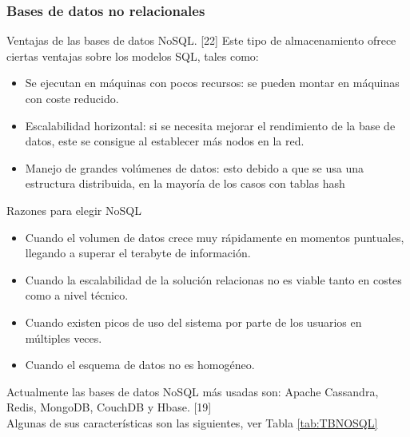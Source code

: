 \subsubsection{Bases de datos no relacionales}

Ventajas de las bases de datos NoSQL. [22]
Este tipo de almacenamiento ofrece ciertas ventajas sobre los modelos SQL, tales como:
\begin{itemize}
	\item Se ejecutan en máquinas con pocos recursos: se pueden montar en máquinas con coste 
	reducido.
	\item Escalabilidad horizontal: si se necesita mejorar el rendimiento de la base de datos, este 
	se consigue al establecer más nodos en la red.
	\item Manejo de grandes volúmenes de datos: esto debido a que se usa una estructura 
	distribuida, en la mayoría de los casos con tablas hash
\end{itemize}


Razones para elegir NoSQL
\begin{itemize}
	\item 	Cuando el volumen de datos crece muy rápidamente en momentos puntuales, llegando a superar el terabyte de información.
	\item 	Cuando la escalabilidad de la solución relacionas no es viable tanto en costes como a nivel técnico.
	\item 	Cuando existen picos de uso del sistema por parte de los usuarios en múltiples veces.
	\item 		Cuando el esquema de datos no es homogéneo. 
\end{itemize}

Actualmente las bases de datos NoSQL más usadas son: Apache Cassandra, Redis, MongoDB, CouchDB y Hbase. [19]
\\

Algunas de sus características son las siguientes, ver Tabla \ref{tab:TBNOSQL}

